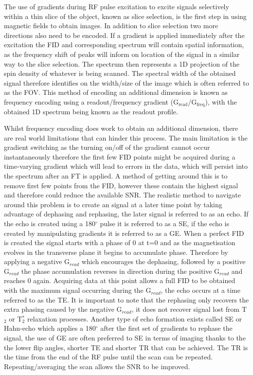 The use of gradients during \ac{RF} pulse excitation to excite signals selectively within a thin slice of the object, known as slice selection, is the first step in using magnetic fields to obtain images. In addition to slice selection two more directions also need to be encoded. If a gradient is applied immediately after the excitation the \ac{FID} and corresponding spectrum will contain spatial information, as the frequency shift of peaks will inform on location of the signal in a similar way to the slice selection. The spectrum then represents a 1D projection of the spin density of whatever is being scanned. The spectral width of the obtained signal therefore identifies on the width/size of the image which is often referred to as the \ac{FOV}. This method of encoding an additional dimension is known as frequency encoding using a readout/frequency gradient (G$_{\textrm{read}}$/G$_{\textrm{freq}}$), with the obtained 1D spectrum being known as the readout profile.

Whilst frequency encoding does work to obtain an additional dimension, there are real world limitations that can hinder this process. The main limitation is the gradient switching as the turning on/off of the gradient cannot occur instantaneously therefore the first few \ac{FID} points might be acquired during a time-varying gradient which will lead to errors in the data, which will persist into the spectrum after an \ac{FT} is applied. A method of getting around this is to remove first few points from the \ac{FID}, however these contain the highest signal and therefore could reduce the available \ac{SNR}. The realistic method to navigate around this problem is to create an signal at a later time point by taking advantage of dephasing and rephasing, the later signal is referred to as an echo. If the echo is created using a 180$^\circ$ pulse it is referred to as a \ac{SE}, if the echo is created by manipulating gradients it is referred to as a \ac{GE}. When a perfect \ac{FID} is created the signal starts with a phase of 0 at t=0 and as the magnetisation evolves in the transverse plane it begins to accumulate phase. Therefore by applying a negative G$_{read}$ which encourages the dephasing, followed by a positive G$_{read}$ the phase accumulation reverses in direction during the positive G$_{read}$ and reaches 0 again. Acquiring data at this point allows a full \ac{FID} to be obtained with the maximum signal occurring during the G$_{read}$, the echo occurs at a time referred to as the \ac{TE}. It is important to note that the rephasing only recovers the extra phasing caused by the negative G$_{read}$, it does not recover signal lost from T$_2$ or T$_2^*$ relaxation processes. Another type of echo formation exists called \ac{SE} or Hahn-echo \cite{Hahn1950SpinEchoes} which applies a 180$^\circ$ after the first set of gradients to rephase the signal, the use of \ac{GE} are often preferred to SE in terms of imaging thanks to the the lower flip angles, shorter \ac{TE} and shorter \ac{TR} that can be achieved. The \ac{TR} is the time from the end of the \ac{RF} pulse until the scan can be repeated. Repeating/averaging the scan allows the \ac{SNR} to be improved.

